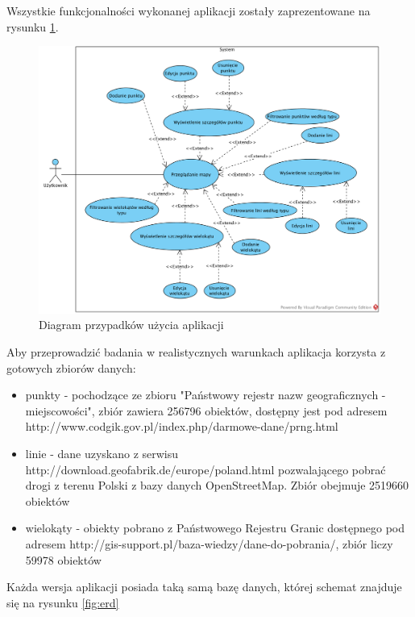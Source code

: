 \documentclass[printmode]{mgr}
\begin{document}
Wszystkie funkcjonalności wykonanej aplikacji zostały zaprezentowane na rysunku \ref{fig:use_cases}.

\begin{figure}[H]
  \centering
  \includegraphics[width=1\linewidth]{pictures/use_cases}
  \caption{Diagram przypadków użycia aplikacji}
  \label{fig:use_cases}
\end{figure}

Aby przeprowadzić badania w realistycznych warunkach aplikacja korzysta z gotowych zbiorów danych:
\begin{itemize}
  \item punkty - pochodzące ze zbioru "Państwowy rejestr nazw geograficznych - miejscowości", zbiór zawiera 256796 obiektów, dostępny jest pod adresem http://www.codgik.gov.pl/index.php/darmowe-dane/prng.html
  \item linie - dane uzyskano z serwisu http://download.geofabrik.de/europe/poland.html pozwalającego pobrać drogi z terenu Polski z bazy danych OpenStreetMap. Zbiór obejmuje 2519660 obiektów
  \item wielokąty - obiekty pobrano z Państwowego Rejestru Granic dostępnego pod adresem http://gis-support.pl/baza-wiedzy/dane-do-pobrania/, zbiór liczy 59978 obiektów
\end{itemize}

Każda wersja aplikacji posiada taką samą bazę danych, której schemat znajduje się na rysunku \ref{fig:erd}
\end{document}
